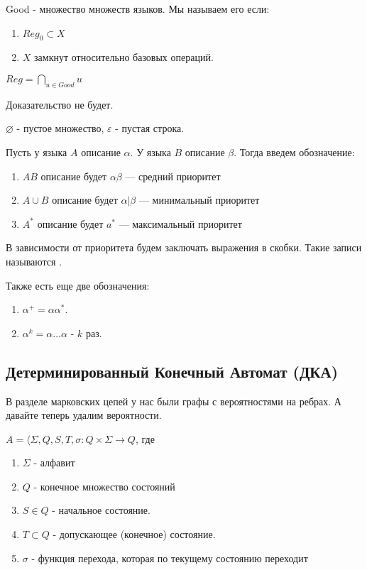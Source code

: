Good - множество множеств языков. Мы называем его  если:
\begin{enumerate}
    \item $Reg_0 \subset X$
    \item $X$ замкнут относительно базовых операций.
\end{enumerate}

 $Reg = \bigcap\limits_{u \in Good} u$

Доказательство не будет.

$\varnothing$ - пустое множество, $\varepsilon$ - пустая строка.

Пусть у языка $A$ описание $\alpha$. У языка $B$ описание $\beta$. Тогда введем обозначение:

\begin{enumerate}
    \item $AB$ описание будет $\alpha \beta$ --- средний приоритет
    \item $A \cup B$ описание будет $\alpha | \beta$ --- минимальный приоритет
    \item $A^*$ описание будет $a^*$ --- максимальный приоритет
\end{enumerate}

В зависимости от приоритета будем заключать выражения в скобки. Такие записи называются .

Также есть еще две обозначения:
\begin{enumerate}
    \item $\alpha^+  = \alpha \alpha^* $.
    \item $\alpha^k = \alpha\ldots \alpha$ - $k$ раз.
\end{enumerate}

\subsection{Детерминированный Конечный Автомат (ДКА)}

В разделе марковских цепей у нас были графы с вероятностями на ребрах. А давайте теперь удалим вероятности. 

$A = \langle \Sigma, Q,S,T, \sigma: Q \times \Sigma \rightarrow Q$, где

\begin{enumerate}
    \item $\Sigma$ - алфавит
    \item $Q$ - конечное множество состояний
    \item $S\in Q$ - начальное состояние.
    \item $T\subset Q$ - допускающее (конечное) состояние. 
    \item $\sigma$ - функция перехода, которая по текущему состоянию переходит
\end{enumerate}

